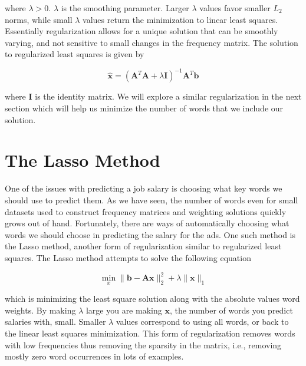\documentclass[12pt]{article}
\begin{document}
    \noindent where $\lambda > 0$. $\lambda$ is the smoothing parameter. Larger
    $\lambda$ values favor smaller $L_2$ norms, while small $\lambda$ values
    return the minimization to linear least squares.  Essentially
    regularization allows for a unique solution that can be smoothly varying,
    and not sensitive to small changes in the frequency matrix. The solution to
    regularized least squares is given by

    \begin{equation}
        \bm{\hat{x}} = (\bm{A}^{T}\bm{A} + \lambda \bm{I})^{-1}\bm{A}^T\bm{b}
    \end{equation}

    \noindent where $\bm{I}$ is the identity matrix. We will explore a similar
    regularization in the next section which will help us minimize the number
    of words that we include our solution.

\section{The Lasso Method}

    One of the issues with predicting a job salary is choosing what key words
    we should use to predict them. As we have seen, the number of words even
    for small datasets used to construct frequency matrices and weighting
    solutions quickly grows out of hand. Fortunately, there are ways of
    automatically choosing what words we should choose in predicting the salary
    for the ads. One such method is the Lasso method, another form of
    regularization similar to regularized least squares. The Lasso method
    attempts to solve the following equation

    \begin{equation}
        \min_x \|\bm{b} - \bm{Ax}\|_2^2 + \lambda\|\bm{x}\|_1
    \end{equation}

    \noindent which is minimizing the least square solution along with the
    absolute values word weights. By making $\lambda$ large you are making
    $\bm{x}$, the number of words you predict salaries with, small. Smaller
    $\lambda$ values correspond to using all words, or back to the linear least
    squares minimization. This form of regularization removes words with low
    frequencies thus removing the sparsity in the matrix, i.e., removing mostly
    zero word occurrences in lots of examples. 
\end{document}
